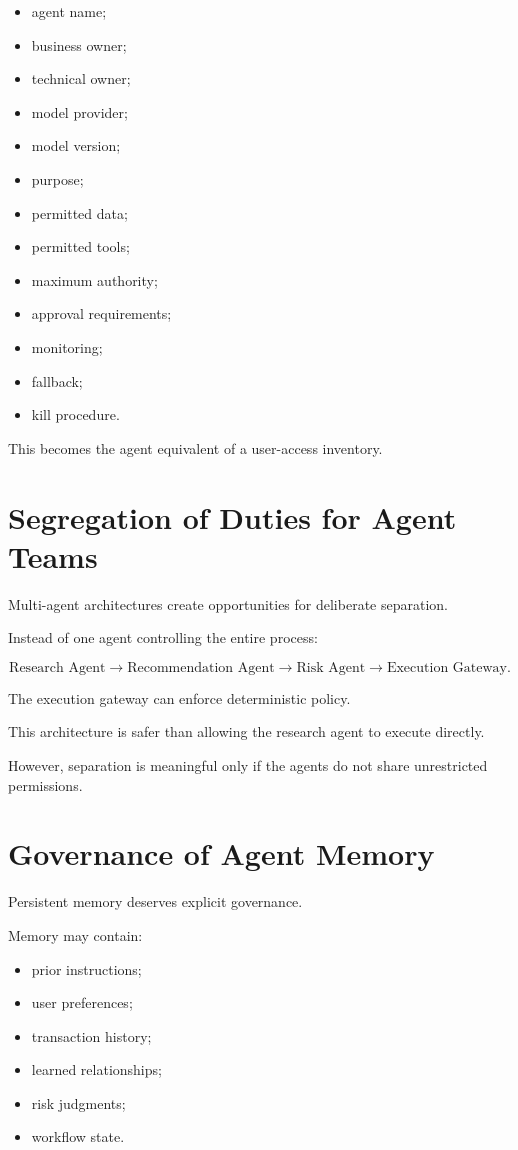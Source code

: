 \begin{itemize}
    \item agent name;
    \item business owner;
    \item technical owner;
    \item model provider;
    \item model version;
    \item purpose;
    \item permitted data;
    \item permitted tools;
    \item maximum authority;
    \item approval requirements;
    \item monitoring;
    \item fallback;
    \item kill procedure.
\end{itemize}

This becomes the agent equivalent of a user-access inventory.

\section{Segregation of Duties for Agent Teams}

Multi-agent architectures create opportunities for deliberate separation.

Instead of one agent controlling the entire process:

\begin{equation}
\text{Research Agent}
\rightarrow
\text{Recommendation Agent}
\rightarrow
\text{Risk Agent}
\rightarrow
\text{Execution Gateway}.
\end{equation}

The execution gateway can enforce deterministic policy.

This architecture is safer than allowing the research agent to execute directly.

However, separation is meaningful only if the agents do not share unrestricted permissions.

\section{Governance of Agent Memory}

Persistent memory deserves explicit governance.

Memory may contain:

\begin{itemize}
    \item prior instructions;
    \item user preferences;
    \item transaction history;
    \item learned relationships;
    \item risk judgments;
    \item workflow state.
\end{itemize}

